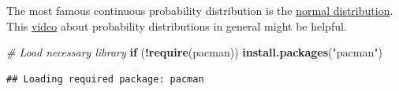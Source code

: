 \documentclass[
]{book}
\newenvironment{Shaded}{\begin{snugshade}}{\end{snugshade}}
\newcommand{\CommentTok}[1]{\textcolor[rgb]{0.56,0.35,0.01}{\textit{#1}}}
\newcommand{\ControlFlowTok}[1]{\textcolor[rgb]{0.13,0.29,0.53}{\textbf{#1}}}
\newcommand{\FunctionTok}[1]{\textcolor[rgb]{0.13,0.29,0.53}{\textbf{#1}}}
\newcommand{\NormalTok}[1]{#1}
\newcommand{\SpecialCharTok}[1]{\textcolor[rgb]{0.81,0.36,0.00}{\textbf{#1}}}
\newcommand{\StringTok}[1]{\textcolor[rgb]{0.31,0.60,0.02}{#1}}
\begin{document}
The most famous continuous probability distribution is the
\href{https://en.wikipedia.org/wiki/Normal_distribution}{normal distribution}.
This \href{https://www.youtube.com/watch?v=k5sbE1_MDwU&ab_channel=VeryNormal}{video}
about probability distributions in general might be helpful.

\begin{Shaded}
\begin{Highlighting}[]
\CommentTok{\# Load necessary library}
\ControlFlowTok{if}\NormalTok{ (}\SpecialCharTok{!}\FunctionTok{require}\NormalTok{(pacman)) }\FunctionTok{install.packages}\NormalTok{(}\StringTok{"pacman"}\NormalTok{)}
\end{Highlighting}
\end{Shaded}

\begin{verbatim}
## Loading required package: pacman
\end{verbatim}
\end{document}
